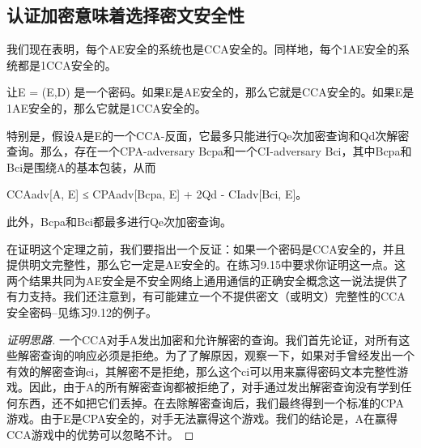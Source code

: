 \subsection{认证加密意味着选择密文安全性}\label{subsec:9-2-3}

我们现在表明，每个AE安全的系统也是CCA安全的。同样地，每个1AE安全的系统都是1CCA安全的。

\begin{theorem}\label{theo:9-1}
让E = (E,D) 是一个密码。如果E是AE安全的，那么它就是CCA安全的。如果E是1AE安全的，那么它就是1CCA安全的。

特别是，假设A是E的一个CCA-反面，它最多只能进行Qe次加密查询和Qd次解密查询。那么，存在一个CPA-adversary Bcpa和一个CI-adversary Bci，其中Bcpa和Bci是围绕A的基本包装，从而

CCAadv[A, E] ≤ CPAadv[Bcpa, E] + 2Qd - CIadv[Bci, E]。

此外，Bcpa和Bci都最多进行Qe次加密查询。
\end{theorem}

在证明这个定理之前，我们要指出一个反证：如果一个密码是CCA安全的，并且提供明文完整性，那么它一定是AE安全的。在练习9.15中要求你证明这一点。这两个结果共同为AE安全是不安全网络上通用通信的正确安全概念这一说法提供了有力支持。我们还注意到，有可能建立一个不提供密文（或明文）完整性的CCA安全密码--见练习9.12的例子。

\begin{proof}[证明思路]
一个CCA对手A发出加密和允许解密的查询。我们首先论证，对所有这些解密查询的响应必须是拒绝。为了了解原因，观察一下，如果对手曾经发出一个有效的解密查询ci，其解密不是拒绝，那么这个ci可以用来赢得密码文本完整性游戏。因此，由于A的所有解密查询都被拒绝了，对手通过发出解密查询没有学到任何东西，还不如把它们丢掉。在去除解密查询后，我们最终得到一个标准的CPA游戏。由于E是CPA安全的，对手无法赢得这个游戏。我们的结论是，A在赢得CCA游戏中的优势可以忽略不计。
\end{proof}

